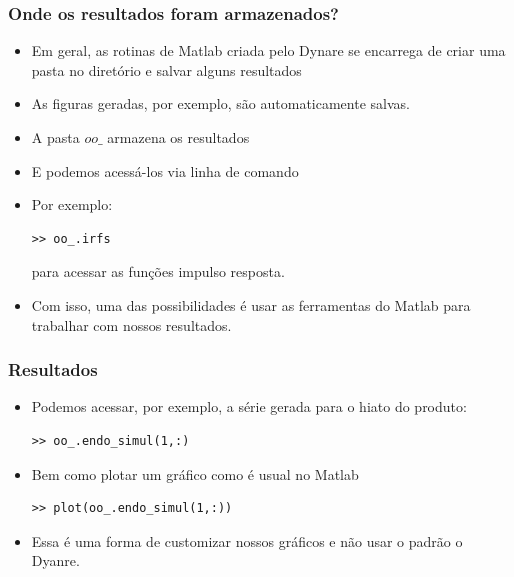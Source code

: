 \documentclass[xcolor=pdftex,dvipsnames,table]{beamer}
\newcommand{\ft}{\frametitle}
\begin{document}

\begin{frame}[fragile]
\ft{Onde os resultados foram armazenados?}

\begin{itemize}
\item Em geral, as rotinas de Matlab criada pelo Dynare se encarrega de criar uma pasta no diretório e salvar alguns resultados

\item As figuras geradas, por exemplo, são automaticamente salvas.

\item A pasta $oo\_$ armazena os resultados

\item E podemos acessá-los via linha de comando

\item Por exemplo:

\begin{lstlisting}
>> oo_.irfs
\end{lstlisting}

para acessar as funções impulso resposta.
\item Com isso, uma das possibilidades é usar as ferramentas do Matlab para trabalhar com nossos resultados.
\end{itemize}

\end{frame}


\begin{frame}[fragile]
\ft{Resultados}

\begin{itemize}
\item Podemos acessar, por exemplo, a série gerada para o hiato do produto:

\begin{lstlisting}
>> oo_.endo_simul(1,:)
\end{lstlisting}

\item Bem como plotar um gráfico como é usual no Matlab

\begin{lstlisting}
>> plot(oo_.endo_simul(1,:))
\end{lstlisting}

\item Essa é uma forma de customizar nossos gráficos e não usar o padrão o Dyanre.

\end{itemize}

\end{frame}
\end{document}
